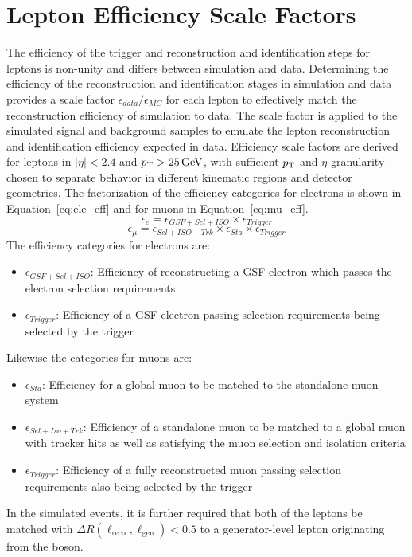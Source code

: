 \chapter{Lepton Efficiency Scale Factors}\label{ch:eff}
The efficiency of the trigger and reconstruction and identification steps for leptons is non-unity and differs between simulation and data. Determining the efficiency of the reconstruction and identification stages in simulation and data provides a scale factor $\epsilon_{data}/\epsilon_{MC}$ for each lepton to effectively match the reconstruction efficiency of simulation to data. The scale factor is applied to the simulated signal and background samples to emulate the lepton reconstruction and identification efficiency expected in data. Efficiency scale factors are derived for leptons in $|\eta|<2.4$ and $p_{\mathrm{T}}>25\,\text{Ge\hspace{-.08em}V}$, with sufficient $p_{\mathrm{T}}$ and $\eta$ granularity chosen to separate behavior in different kinematic regions and detector geometries. The factorization of the efficiency categories for electrons is shown in Equation~\ref{eq:ele_eff} and for muons in Equation~\ref{eq:mu_eff}.
\begin{equation}
  \epsilon_{e} = \epsilon_{GSF+Sel+ISO} \times \epsilon_{Trigger}
  \label{eq:ele_eff}
\end{equation}
\begin{equation}
  \epsilon_{\mu} = \epsilon_{Sel+ISO+Trk} \times  \epsilon_{Sta} \times \epsilon_{Trigger}
  \label{eq:mu_eff}
\end{equation}
The efficiency categories for electrons are:
\begin{itemize}
    \item $\epsilon_{GSF+Sel+ISO}$: Efficiency of reconstructing a GSF electron which passes the electron selection requirements
    \item $\epsilon_{Trigger}$: Efficiency of a GSF electron passing selection requirements being selected by the trigger
\end{itemize}
Likewise the categories for muons are:
\begin{itemize}
    \item $\epsilon_{Sta}$: Efficiency for a global muon to be matched to the standalone muon system
    \item $\epsilon_{Sel+Iso+Trk}$: Efficiency of a standalone muon to be matched to a global muon with tracker hits as well as satisfying the muon selection and isolation criteria
    \item $\epsilon_{Trigger}$: Efficiency of a fully reconstructed muon passing selection requirements also being selected by the trigger
\end{itemize}
In the simulated \zll events, it is further required that both of the leptons be matched with $\Delta R(\ell_{\mathrm{reco}},\ell_{\mathrm{gen}}) < 0.5$ to a generator-level lepton originating from the \Z boson. 


